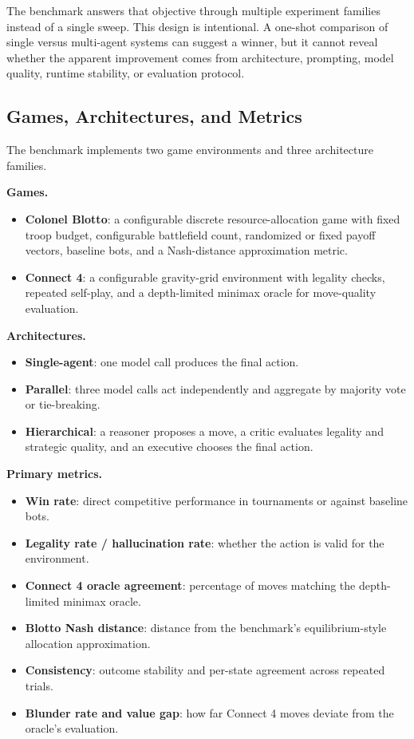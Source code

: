 \documentclass[11pt]{article}
\begin{document}
The benchmark answers that objective through multiple experiment families instead of a single sweep. This design is intentional. A one-shot comparison of single versus multi-agent systems can suggest a winner, but it cannot reveal whether the apparent improvement comes from architecture, prompting, model quality, runtime stability, or evaluation protocol.

\subsection{Games, Architectures, and Metrics}
The benchmark implements two game environments and three architecture families.

\textbf{Games.}
\begin{itemize}
  \item \textbf{Colonel Blotto}: a configurable discrete resource-allocation game with fixed troop budget, configurable battlefield count, randomized or fixed payoff vectors, baseline bots, and a Nash-distance approximation metric.
  \item \textbf{Connect 4}: a configurable gravity-grid environment with legality checks, repeated self-play, and a depth-limited minimax oracle for move-quality evaluation.
\end{itemize}

\textbf{Architectures.}
\begin{itemize}
  \item \textbf{Single-agent}: one model call produces the final action.
  \item \textbf{Parallel}: three model calls act independently and aggregate by majority vote or tie-breaking.
  \item \textbf{Hierarchical}: a reasoner proposes a move, a critic evaluates legality and strategic quality, and an executive chooses the final action.
\end{itemize}

\textbf{Primary metrics.}
\begin{itemize}
  \item \textbf{Win rate}: direct competitive performance in tournaments or against baseline bots.
  \item \textbf{Legality rate / hallucination rate}: whether the action is valid for the environment.
  \item \textbf{Connect 4 oracle agreement}: percentage of moves matching the depth-limited minimax oracle.
  \item \textbf{Blotto Nash distance}: distance from the benchmark's equilibrium-style allocation approximation.
  \item \textbf{Consistency}: outcome stability and per-state agreement across repeated trials.
  \item \textbf{Blunder rate and value gap}: how far Connect 4 moves deviate from the oracle's evaluation.
\end{itemize}
\end{document}
